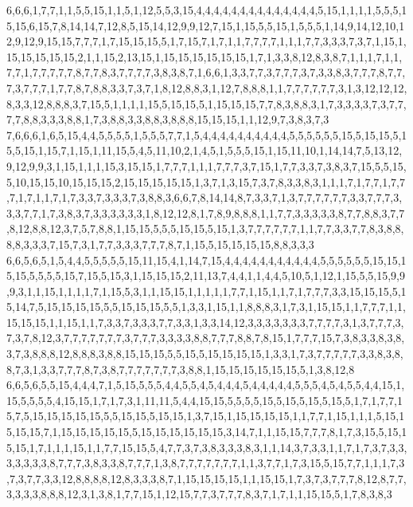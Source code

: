 6,6,6,1,7,7,1,1,5,5,15,1,1,5,1,12,5,5,3,15,4,4,4,4,4,4,4,4,4,4,4,4,4,4,5,15,1,1,1,1,5,5,5,15,15,6,15,7,8,14,14,7,12,8,5,15,14,12,9,9,12,7,15,1,15,5,5,15,1,5,5,5,1,14,9,14,12,10,12,9,12,9,15,15,7,7,7,1,7,15,15,15,5,1,7,15,7,1,7,1,1,7,7,7,7,1,1,1,7,7,3,3,3,7,3,7,1,15,1,15,15,15,15,15,2,1,1,15,2,13,15,1,15,15,15,15,15,15,1,7,1,3,3,8,12,8,3,8,7,1,1,1,7,1,1,7,7,1,7,7,7,7,7,8,7,7,8,3,7,7,7,7,3,8,3,8,7,1,6,6,1,3,3,7,7,3,7,7,7,3,7,3,3,8,3,7,7,7,8,7,7,7,3,7,7,7,1,7,7,8,7,8,8,3,3,7,3,7,1,8,12,8,8,3,1,12,7,8,8,8,1,1,7,7,7,7,7,7,3,1,3,12,12,12,8,3,3,12,8,8,8,3,7,15,5,1,1,1,1,15,5,15,15,5,1,15,15,15,7,7,8,3,8,8,3,1,7,3,3,3,3,7,3,7,7,7,7,8,8,3,3,3,8,8,1,7,3,8,8,3,3,8,8,3,8,8,8,15,15,15,1,1,12,9,7,3,8,3,7,3
7,6,6,6,1,6,5,15,4,4,5,5,5,5,1,5,5,5,7,7,1,5,4,4,4,4,4,4,4,4,4,4,5,5,5,5,5,5,15,5,15,15,5,15,5,15,1,15,7,1,15,1,11,15,5,4,5,11,10,2,1,4,5,1,5,5,5,15,1,15,11,10,1,14,14,7,5,13,12,9,12,9,9,3,1,15,1,1,1,15,3,15,15,1,7,7,7,1,1,1,7,7,7,3,7,15,1,7,7,3,3,7,3,8,3,7,15,5,5,15,5,10,15,15,10,15,15,15,2,15,15,15,15,15,1,3,7,1,3,15,7,3,7,8,3,3,8,3,1,1,1,7,1,7,7,1,7,7,7,1,7,1,1,7,1,7,3,3,7,3,3,3,7,3,8,8,3,6,6,7,8,14,14,8,7,3,3,7,1,3,7,7,7,7,7,7,3,3,7,7,7,3,3,3,7,7,1,7,3,8,3,7,3,3,3,3,3,3,1,8,12,12,8,1,7,8,9,8,8,8,1,1,7,7,3,3,3,3,3,8,7,7,8,8,3,7,7,8,12,8,8,12,3,7,5,7,8,8,1,15,15,5,5,5,15,15,5,15,1,3,7,7,7,7,7,7,1,1,7,7,3,3,7,7,8,3,8,8,8,8,3,3,3,7,15,7,3,1,7,7,3,3,3,7,7,7,8,7,1,15,5,15,15,15,15,8,8,3,3,3
6,6,5,6,5,1,5,4,4,5,5,5,5,5,15,11,15,4,1,14,7,15,4,4,4,4,4,4,4,4,4,4,4,5,5,5,5,5,5,15,15,15,15,5,5,5,5,15,7,15,5,15,3,1,15,15,15,2,11,13,7,4,4,1,1,4,4,5,10,5,1,12,1,15,5,5,15,9,9,9,3,1,1,15,1,1,1,1,7,1,15,5,3,1,1,15,15,1,1,1,1,1,7,7,1,15,1,1,7,1,7,7,7,3,3,15,15,15,5,15,14,7,5,15,15,15,15,5,5,15,15,15,5,5,1,3,3,1,15,1,1,8,8,8,3,1,7,3,1,15,15,1,1,7,7,7,1,1,15,15,15,1,1,15,1,1,7,3,3,7,3,3,3,7,7,3,3,1,3,3,14,12,3,3,3,3,3,3,3,7,7,7,7,3,1,3,7,7,7,3,7,3,7,8,12,3,7,7,7,7,7,7,7,3,7,7,7,3,3,3,3,8,8,7,7,7,8,8,7,8,15,1,7,7,7,15,7,3,8,3,3,8,3,8,3,7,3,8,8,8,12,8,8,8,3,8,8,15,15,15,5,5,15,5,15,15,15,15,1,3,3,1,7,3,7,7,7,7,7,3,3,8,3,8,8,7,3,1,3,3,7,7,7,8,7,3,8,7,7,7,7,7,7,7,3,8,8,1,15,15,15,15,15,15,5,1,3,8,12,8
6,6,5,6,5,5,15,4,4,4,7,1,5,15,5,5,5,4,4,5,5,4,5,4,4,4,5,4,4,4,4,4,5,5,5,4,5,4,5,5,4,4,15,1,15,5,5,5,5,4,15,15,1,7,1,7,3,1,11,11,5,4,4,15,15,5,5,5,5,15,5,15,5,15,5,15,5,1,7,1,7,7,15,7,5,15,15,15,15,15,5,5,15,15,5,15,15,1,3,7,15,1,15,15,15,15,1,1,7,7,1,15,1,1,1,5,15,15,15,15,7,1,15,15,15,15,15,5,15,15,15,15,15,15,3,14,7,1,1,15,15,7,7,7,8,1,7,3,15,5,15,15,15,1,7,1,1,1,15,1,1,7,7,15,15,5,4,7,7,3,7,3,8,3,3,3,8,3,1,1,14,3,7,3,3,1,1,7,1,7,3,7,3,3,3,3,3,3,3,8,7,7,7,3,8,3,3,8,7,7,7,1,3,8,7,7,7,7,7,7,7,1,1,3,7,7,1,7,3,15,5,15,7,7,1,1,1,7,3,7,3,7,7,3,3,12,8,8,8,8,12,8,3,3,3,8,7,1,15,15,15,15,1,1,15,15,1,7,3,7,3,7,7,7,8,12,8,7,7,3,3,3,3,8,8,8,12,3,1,3,8,1,7,7,15,1,12,15,7,7,3,7,7,7,8,3,7,1,7,1,1,15,15,5,1,7,8,3,8,3
